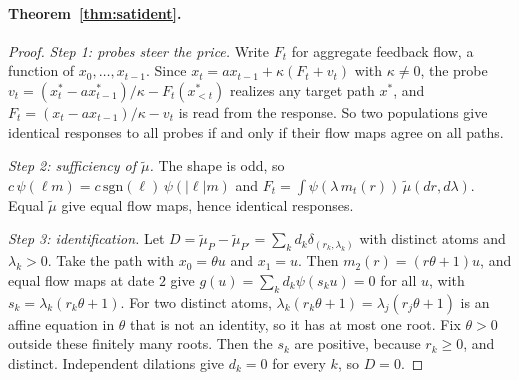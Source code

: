 \documentclass[12pt]{article}
\theoremstyle{definition}
\theoremstyle{remark}
\begin{document}
\paragraph{Theorem~\ref{thm:satident}.}
\begin{proof}
\emph{Step 1: probes steer the price.} Write $F_t$ for aggregate feedback flow, a function of $x_0,\ldots,x_{t-1}$. Since $x_t=ax_{t-1}+\kappa(F_t+v_t)$ with $\kappa\ne0$, the probe $v_t=(x^*_t-ax^*_{t-1})/\kappa-F_t(x^*_{<t})$ realizes any target path $x^*$, and $F_t=(x_t-ax_{t-1})/\kappa-v_t$ is read from the response. So two populations give identical responses to all probes if and only if their flow maps agree on all paths.

\emph{Step 2: sufficiency of $\tilde\mu$.} The shape is odd, so $c\,\psi(\ell m)=c\,\mathrm{sgn}(\ell)\,\psi(|\ell|m)$ and $F_t=\int\psi(\lambda\,m_t(r))\,\tilde\mu(dr,d\lambda)$. Equal $\tilde\mu$ give equal flow maps, hence identical responses.

\emph{Step 3: identification.} Let $D=\tilde\mu_P-\tilde\mu_{P'}=\sum_kd_k\delta_{(r_k,\lambda_k)}$ with distinct atoms and $\lambda_k>0$. Take the path with $x_0=\theta u$ and $x_1=u$. Then $m_2(r)=(r\theta+1)u$, and equal flow maps at date $2$ give $g(u)=\sum_kd_k\psi(s_ku)=0$ for all $u$, with $s_k=\lambda_k(r_k\theta+1)$. For two distinct atoms, $\lambda_k(r_k\theta+1)=\lambda_j(r_j\theta+1)$ is an affine equation in $\theta$ that is not an identity, so it has at most one root. Fix $\theta>0$ outside these finitely many roots. Then the $s_k$ are positive, because $r_k\ge0$, and distinct. Independent dilations give $d_k=0$ for every $k$, so $D=0$.
\end{proof}
\end{document}
